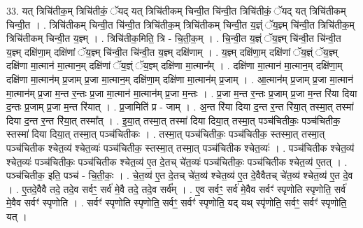 \documentclass[17pt]{extarticle}
\begin{document}
33. यत् त्रिचि॑तीक॒म् त्रिचि॑तीकं॒ ॅयद् यत् त्रिचि॑तीकम् चिन्वी॒त चि॑न्वी॒त त्रिचि॑तीकं॒ ॅयद् यत् त्रिचि॑तीकम् चिन्वी॒त । . त्रिचि॑तीकम् चिन्वी॒त चि॑न्वी॒त त्रिचि॑तीक॒म् त्रिचि॑तीकम् चिन्वी॒त य॒ज्ञ्ं ॅय॒ज्ञ्म् चि॑न्वी॒त त्रिचि॑तीक॒म् त्रिचि॑तीकम् चिन्वी॒त य॒ज्ञ्म् । . त्रिचि॑तीक॒मिति॒ त्रि - चि॒ती॒क॒म् । . चि॒न्वी॒त य॒ज्ञ्ं ॅय॒ज्ञ्म् चि॑न्वी॒त चि॑न्वी॒त य॒ज्ञ्म् दक्षि॑णा॒म् दक्षि॑णां ॅय॒ज्ञ्म् चि॑न्वी॒त चि॑न्वी॒त य॒ज्ञ्म् दक्षि॑णाम् । . य॒ज्ञ्म् दक्षि॑णा॒म् दक्षि॑णां ॅय॒ज्ञ्ं ॅय॒ज्ञ्म् दक्षि॑णा मा॒त्मान॑ मा॒त्मान॒म् दक्षि॑णां ॅय॒ज्ञ्ं ॅय॒ज्ञ्म् दक्षि॑णा मा॒त्मान᳚म् । . दक्षि॑णा मा॒त्मान॑ मा॒त्मान॒म् दक्षि॑णा॒म् दक्षि॑णा मा॒त्मान॑म् प्र॒जाम् प्र॒जा मा॒त्मान॒म् दक्षि॑णा॒म् दक्षि॑णा मा॒त्मान॑म् प्र॒जाम् । . आ॒त्मान॑म् प्र॒जाम् प्र॒जा मा॒त्मान॑ मा॒त्मान॑म् प्र॒जा म॒न्त र॒न्तः प्र॒जा मा॒त्मान॑ मा॒त्मान॑म् प्र॒जा म॒न्तः । . प्र॒जा म॒न्त र॒न्तः प्र॒जाम् प्र॒जा म॒न्त रि॑या दिया द॒न्तः प्र॒जाम् प्र॒जा म॒न्त रि॑यात् । . प्र॒जामिति॑ प्र - जाम् । . अ॒न्त रि॑या दिया द॒न्त र॒न्त रि॑या॒त् तस्मा॒त् तस्मा॑ दिया द॒न्त र॒न्त रि॑या॒त् तस्मा᳚त् । . इ॒या॒त् तस्मा॒त् तस्मा॑ दिया दिया॒त् तस्मा॒त् पञ्च॑चितीकः॒ पञ्च॑चितीक॒ स्तस्मा॑ दिया दिया॒त् तस्मा॒त् पञ्च॑चितीकः । . तस्मा॒त् पञ्च॑चितीकः॒ पञ्च॑चितीक॒ स्तस्मा॒त् तस्मा॒त् पञ्च॑चितीक श्चेत॒व्य॑ श्चेत॒व्यः॑ पञ्च॑चितीक॒ स्तस्मा॒त् तस्मा॒त् पञ्च॑चितीक श्चेत॒व्यः॑ । . पञ्च॑चितीक श्चेत॒व्य॑ श्चेत॒व्यः॑ पञ्च॑चितीकः॒ पञ्च॑चितीक श्चेत॒व्य॑ ए॒त दे॒तच् चे॑त॒व्यः॑ पञ्च॑चितीकः॒ पञ्च॑चितीक श्चेत॒व्य॑ ए॒तत् । . पञ्च॑चितीक॒ इति॒ पञ्च॑ - चि॒ती॒कः॒ । . चे॒त॒व्य॑ ए॒त दे॒तच् चे॑त॒व्य॑ श्चेत॒व्य॑ ए॒त दे॒वैवैतच् चे॑त॒व्य॑ श्चेत॒व्य॑ ए॒त दे॒व । . ए॒तदे॒वैवै तदे॒ तदे॒व सर्वꣳ॒॒ सर्व॑ मे॒वै तदे॒ तदे॒व सर्व᳚म् । . ए॒व सर्वꣳ॒॒ सर्व॑ मे॒वैव सर्वꣳ॑ स्पृणोति स्पृणोति॒ सर्व॑ मे॒वैव सर्वꣳ॑ स्पृणोति । . सर्वꣳ॑ स्पृणोति स्पृणोति॒ सर्वꣳ॒॒ सर्वꣳ॑ स्पृणोति॒ यद् यथ् स्पृ॑णोति॒ सर्वꣳ॒॒ सर्वꣳ॑ स्पृणोति॒ यत् । \newline
\end{document}
